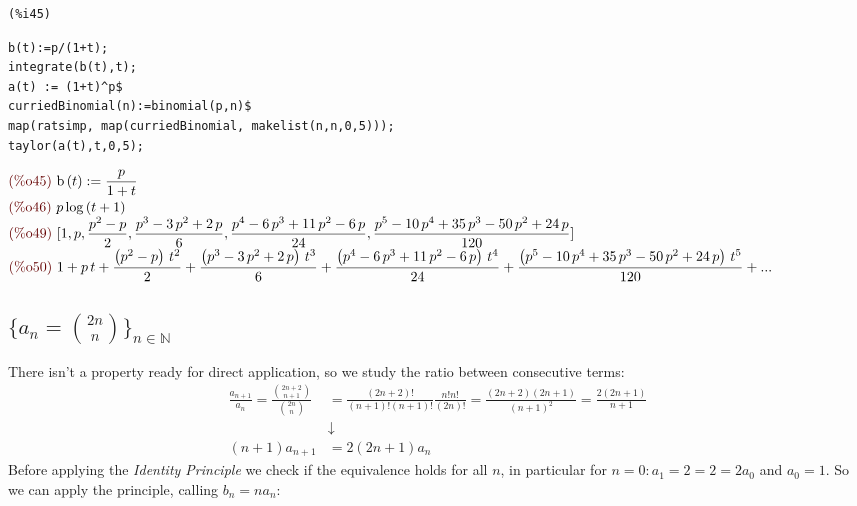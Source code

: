 \noindent
\begin{minipage}[t]{8ex}{\color{red}\bf
\begin{verbatim}
(%i45) 
\end{verbatim}}
\end{minipage}
\begin{minipage}[t]{\textwidth}{\color{blue}
\begin{verbatim}
b(t):=p/(1+t);
integrate(b(t),t);
a(t) := (1+t)^p$
curriedBinomial(n):=binomial(p,n)$
map(ratsimp, map(curriedBinomial, makelist(n,n,0,5)));
taylor(a(t),t,0,5);
\end{verbatim}}
\end{minipage}
\begin{math}\displaystyle
\parbox{8ex}{\color{labelcolor}(\%o45) }
\mathrm{b}\left( t\right) :=\frac{p}{1+t}
\end{math}\\
\begin{math}\displaystyle
\parbox{8ex}{\color{labelcolor}(\%o46) }
p\,\mathrm{log}\left( t+1\right) 
\end{math}\\
\begin{math}\displaystyle
\parbox{8ex}{\color{labelcolor}(\%o49) }
[1,p,\frac{{p}^{2}-p}{2},\frac{{p}^{3}-3\,{p}^{2}+2\,p}{6},\frac{{p}^{4}-6\,{p}^{3}+11\,{p}^{2}-6\,p}{24},\\\frac{{p}^{5}-10\,{p}^{4}+35\,{p}^{3}-50\,{p}^{2}+24\,p}{120}]
\end{math}\\
\begin{math}\displaystyle
\parbox{8ex}{\color{labelcolor}(\%o50) }
1+p\,t+\frac{\left( {p}^{2}-p\right) \,{t}^{2}}{2}+\frac{\left(
    {p}^{3}-3\,{p}^{2}+2\,p\right) \,{t}^{3}}{6}+\frac{\left(
    {p}^{4}-6\,{p}^{3}+11\,{p}^{2}-6\,p\right)
  \,{t}^{4}}{24}+\frac{\left(
    {p}^{5}-10\,{p}^{4}+35\,{p}^{3}-50\,{p}^{2}+24\,p\right)
  \,{t}^{5}}{120}+...
\end{math}

\subsection{$\{a_n = {{2n}\choose{n}} \}_{n \in \mathbb{N} }$}

There isn't a property ready for direct application, so we study the
ratio between consecutive terms:
\begin{displaymath}
  \begin{split}
    \frac{a_{n+1}}{a_n} = \frac{{{2n+2}\choose{n+1}}
    }{{{2n}\choose{n}} } &= \frac{(2n+2)!}{(n + 1)!(n+1)!}
    \frac{n!n!}{(2n)!} =
    \frac{(2n+2)(2n+1)}{(n+1)^2} = \frac{2(2n+1)}{n+1}\\
    &\downarrow \\
    (n+1)a_{n+1} &= 2(2n+1)a_n
  \end{split}
\end{displaymath}
Before applying the \emph{Identity Principle} we check if the
equivalence holds for all $n$, in particular for $n=0: a_1 = 2 = 2 =
2a_0$ and $a_0=1$. So we can apply the principle, calling $b_n = n
a_n$:

